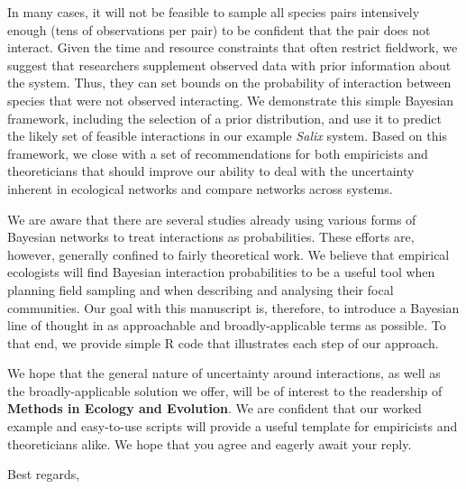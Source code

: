 \documentclass[12pt]{letter}
\begin{document}
\begin{letter}
    In many cases, it will not be feasible to sample all species pairs intensively enough (tens of observations per pair) to be confident that the pair does not interact. Given the time and resource constraints that often restrict fieldwork, we suggest that researchers supplement observed data with prior information about the system. Thus, they can set bounds on the probability of interaction between species that were not observed interacting. We demonstrate this simple Bayesian framework, including the selection of a prior distribution, and use it to predict the likely set of feasible interactions in our example \emph{Salix} system. Based on this framework, we close with a set of recommendations for both empiricists and theoreticians that should improve our ability to deal with the uncertainty inherent in ecological networks and compare networks across systems.


    We are aware that there are several studies already using various forms of Bayesian networks to treat interactions as probabilities. These efforts are, however, generally confined to fairly theoretical work. We believe that empirical ecologists will find Bayesian interaction probabilities to be a useful tool when planning field sampling and when describing and analysing their focal communities. Our goal with this manuscript is, therefore, to introduce a Bayesian line of thought in as approachable and broadly-applicable terms as possible. To that end, we provide simple R code that illustrates each step of our approach. 


    We hope that the general nature of uncertainty around interactions, as well as the broadly-applicable solution we offer, will be of interest to the readership of \textbf{Methods in Ecology and Evolution}. We are confident that our worked example and easy-to-use scripts will provide a useful template for empiricists and theoreticians alike. We hope that you agree and eagerly await your reply.


\closing{Best regards,}


\end{letter}
\end{document}
